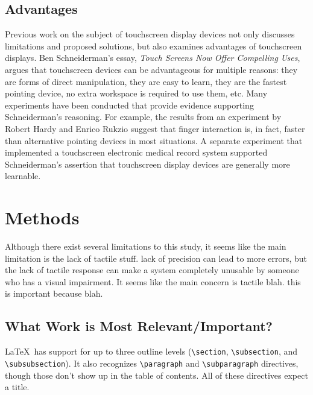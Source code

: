 \documentclass{article}
\begin{document}
\clearpage

\subsection{Advantages}
Previous work on the subject of touchscreen display devices not only discusses limitations and proposed solutions, but also examines advantages of touchscreen displays. Ben Schneiderman's essay, \textit{Touch Screens Now Offer Compelling Uses},  argues that touchscreen devices can be advantageous for multiple reasons: they are forms of direct manipulation, they are easy to learn, they are the fastest pointing device, no extra workspace is required to use them, etc. \cite{73754} Many experiments have been conducted that provide evidence supporting Schneiderman's reasoning. For example, the results from an experiment by Robert Hardy and Enrico Rukzio suggest that finger interaction is, in fact, faster than alternative pointing devices in most situations.\cite{Hardy:2008:TIT:1409240.1409267} A separate experiment that implemented a touchscreen electronic medical record system supported Schneiderman's assertion that touchscreen display devices are generally more learnable.\cite{Douglas:2011:SUL:2029976.2029990}


\section{Methods}

Although there exist several limitations to this study, it seems like the main limitation is the lack of tactile stuff. lack of precision can lead to more errors, but the lack of tactile response can make a system completely unusable by someone who has a visual impairment. It seems like the main concern is tactile blah. this is important because blah.

\subsection{What Work is Most Relevant/Important?}

\LaTeX\ has support for up to three outline levels (\verb!\section!, \verb!\subsection!, and \verb!\subsubsection!).  It also recognizes \verb!\paragraph! and \verb!\subparagraph! directives, though those don't show up in the table of contents.  All of these directives expect a title.
\end{document}
